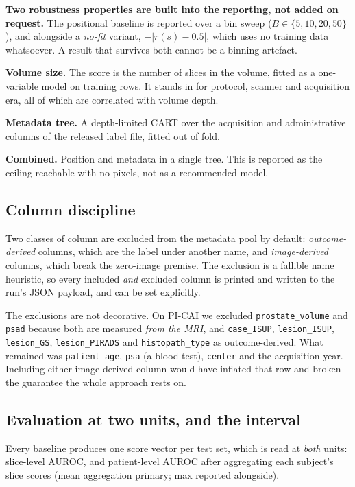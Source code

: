 \documentclass[11pt,a4paper]{article}
\begin{document}
\textbf{Two robustness properties are built into the reporting, not added on request.}
The positional baseline is reported over a bin sweep ($B \in \{5, 10, 20, 50\}$), and
alongside a \emph{no-fit} variant, $-\left|r(s) - 0.5\right|$, which uses no training
data whatsoever. A result that survives both cannot be a binning artefact.

\textbf{Volume size.} The score is the number of slices in the volume, fitted as a
one-variable model on training rows. It stands in for protocol, scanner and
acquisition era, all of which are correlated with volume depth.

\textbf{Metadata tree.} A depth-limited CART over the acquisition and administrative
columns of the released label file, fitted out of fold.

\textbf{Combined.} Position and metadata in a single tree. This is reported as the
ceiling reachable with no pixels, not as a recommended model.

\subsection{Column discipline}

Two classes of column are excluded from the metadata pool by default:
\emph{outcome-derived} columns, which are the label under another name, and
\emph{image-derived} columns, which break the zero-image premise. The exclusion is a
fallible name heuristic, so every included \emph{and} excluded column is printed and
written to the run's JSON payload, and can be set explicitly.

The exclusions are not decorative. On PI-CAI we excluded \texttt{prostate\_volume}
and \texttt{psad} because both are measured \emph{from the MRI}, and
\texttt{case\_ISUP}, \texttt{lesion\_ISUP}, \texttt{lesion\_GS},
\texttt{lesion\_PIRADS} and \texttt{histopath\_type} as outcome-derived. What remained
was \texttt{patient\_age}, \texttt{psa} (a blood test), \texttt{center} and the
acquisition year. Including either image-derived column would have inflated that row
and broken the guarantee the whole approach rests on.

\subsection{Evaluation at two units, and the interval}

Every baseline produces one score vector per test set, which is read at \emph{both}
units: slice-level AUROC, and patient-level AUROC after aggregating each subject's
slice scores (mean aggregation primary; max reported alongside).
\end{document}

